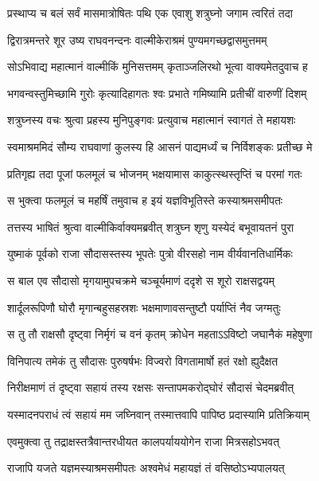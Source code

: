 
\twolineshloka
{प्रस्थाप्य च बलं सर्वं मासमात्रोषितः पथि}
{एक एवाशु शत्रुघ्नो जगाम त्वरितं तदा} %

\twolineshloka
{द्विरात्रमन्तरे शूर उष्य राघवनन्दनः}
{वाल्मीकेराश्रमं पुण्यमगच्छद्वासमुत्तमम्} %

\twolineshloka
{सोऽभिवाद्य महात्मानं वाल्मीकिं मुनिसत्तमम्}
{कृताञ्जलिरथो भूत्वा वाक्यमेतदुवाच ह} %

\twolineshloka
{भगवन्वस्तुमिच्छामि गुरोः कृत्यादिहागतः}
{श्वः प्रभाते गमिष्यामि प्रतीचीं वारुणीं दिशम्} %

\twolineshloka
{शत्रुघ्नस्य वचः श्रुत्वा प्रहस्य मुनिपुङ्गवः}
{प्रत्युवाच महात्मानं स्वागतं ते महायशः} %

\twolineshloka
{स्वमाश्रममिदं सौम्य राघवाणां कुलस्य हि}
{आसनं पाद्यमर्ध्यं च निर्विशङ्कः प्रतीच्छ मे} %

\twolineshloka
{प्रतिगृह्य तदा पूजां फलमूलं च भोजनम्}
{भक्षयामास काकुत्स्थस्तृप्तिं च परमां गतः} %

\twolineshloka
{स भुक्त्वा फलमूलं च महर्षिं तमुवाच ह}
{इयं यज्ञविभूतिस्ते कस्याश्रमसमीपतः} %

\twolineshloka
{तत्तस्य भाषितं श्रुत्वा वाल्मीकिर्वाक्यमब्रवीत्}
{शत्रुघ्न शृणु यस्येदं बभूवायतनं पुरा} %

\twolineshloka
{युष्माकं पूर्वको राजा सौदासस्तस्य भूपतेः}
{पुत्रो वीरसहो नाम वीर्यवानतिधार्मिकः} %

\twolineshloka
{स बाल एव सौदासो मृगयामुपचक्रमे}
{चञ्चूर्यमाणं ददृशे स शूरो राक्षसद्वयम्} %

\twolineshloka
{शार्दूलरूपिणौ घोरौ मृगान्बहुसहस्रशः}
{भक्षमाणावसन्तुष्टौ पर्याप्तिं नैव जग्मतुः} %

\twolineshloka
{स तु तौ राक्षसौ दृष्ट्वा निर्मृगं च वनं कृतम्}
{क्रोधेन महताऽऽविष्टो जघानैकं महेषुणा} %

\twolineshloka
{विनिपात्य तमेकं तु सौदासः पुरुषर्षभः}
{विज्वरो विगतामार्षो हतं रक्षो ह्युदैक्षत} %

\twolineshloka
{निरीक्षमाणं तं दृष्ट्वा सहायं तस्य रक्षसः}
{सन्तापमकरोद्घोरं सौदासं चेदमब्रवीत्} %

\twolineshloka
{यस्मादनपराधं त्वं सहायं मम जघ्निवान्}
{तस्मात्तवापि पापिष्ठ प्रदास्यामि प्रतिक्रियाम्} %

\twolineshloka
{एवमुक्त्वा तु तद्राक्षस्तत्रैवान्तरधीयत}
{कालपर्याययोगेन राजा मित्रसहोऽभवत्} %

\twolineshloka
{राजापि यजते यज्ञमस्याश्रमसमीपतः}
{अश्वमेधं महायज्ञं तं वसिष्ठोऽभ्यपालयत्} %

